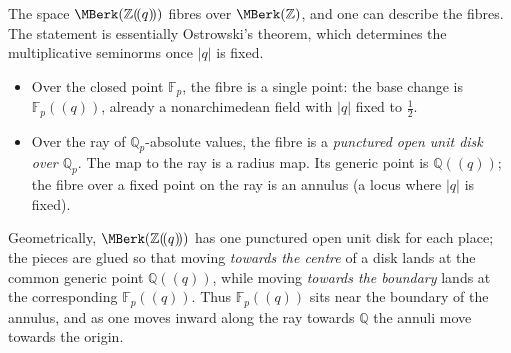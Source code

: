\begin{center}
\end{center}

\begin{remark}
\label{rmk:12:fibres}
The space $\MBerk(\mathbb{Z}(\!(q)\!))$ fibres over $\MBerk(\mathbb{Z})$, and one
can describe the fibres. The statement is essentially Ostrowski's theorem, which
determines the multiplicative seminorms once $|q|$ is fixed.
\begin{itemize}
\item Over the closed point $\mathbb{F}_p$, the fibre is a single point: the base
change is $\mathbb{F}_p(\!(q)\!)$, already a nonarchimedean field with $|q|$
fixed to $\tfrac12$.
\item Over the ray of $\mathbb{Q}_p$-absolute values, the fibre is a
\emph{punctured open unit disk over $\mathbb{Q}_p$}. The map to the ray is a
radius map. Its generic point is $\mathbb{Q}(\!(q)\!)$; the fibre over a fixed
point on the ray is an annulus (a locus where $|q|$ is fixed).
\end{itemize}
Geometrically, $\MBerk(\mathbb{Z}(\!(q)\!))$ has one punctured open unit disk for
each place; the pieces are glued so that moving \emph{towards the centre} of a
disk lands at the common generic point $\mathbb{Q}(\!(q)\!)$, while moving
\emph{towards the boundary} lands at the corresponding $\mathbb{F}_p(\!(q)\!)$.
Thus $\mathbb{F}_p(\!(q)\!)$ sits near the boundary of the annulus, and as one
moves inward along the ray towards $\mathbb{Q}$ the annuli move towards the
origin.
\end{remark}

